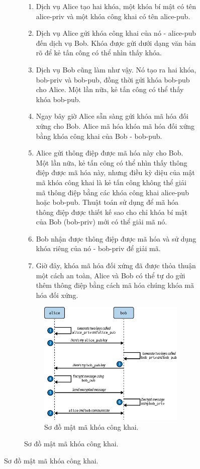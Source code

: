 \documentclass[12pt,a4paper]{report}
\begin{document}
\begin{figure}[htp]
\begin{figure}[htp]
	\hspace{0.3cm}{Hãy xem qua một ví dụ sử dụng hai dịch vụ tưởng tượng, Alice và Bob, muốn đồng ý về một khóa mã hóa đối xứng:}
	
	\begin{enumerate}
	\item Dịch vụ Alice tạo hai khóa, một khóa bí mật có tên alice-priv và một khóa công khai có tên alice-pub.
	\item Dịch vụ Alice gửi khóa công khai của nó - alice-pub đến dịch vụ Bob. Khóa được gửi dưới dạng văn bản rõ để kẻ tấn công có thể nhìn thấy khóa.
	\item Dịch vụ Bob cũng làm như vậy. Nó tạo ra hai khóa, bob-priv và bob-pub, đồng thời gửi khóa bob-pub cho Alice. Một lần nữa, kẻ tấn công có thể thấy khóa bob-pub.
	\item Ngay bây giờ Alice sẵn sàng gửi khóa mã hóa đối xứng cho Bob. Alice mã hóa khóa mã hóa đối xứng bằng khóa công khai của Bob - bob-pub.
	\item Alice gửi thông điệp được mã hóa này cho Bob. Một lần nữa, kẻ tấn công có thể nhìn thấy thông điệp được mã hóa này, nhưng điều kỳ diệu của mật mã khóa công khai là kẻ tấn công không thể giải mã thông điệp bằng các khóa công khai alice-pub hoặc bob-pub. Thuật toán sử dụng để mã hóa thông điệp được thiết kế sao cho chỉ khóa bí mật của Bob (bob-priv) mới có thể giải mã nó.
	\item Bob nhận được thông điệp được mã hóa và sử dụng khóa riêng của nó - bob-priv để giải mã.
	\item Giờ đây, khóa mã hóa đối xứng đã được thỏa thuận một cách an toàn, Alice và Bob có thể tự do gửi thêm thông điệp bằng cách mã hóa chúng khóa mã hóa đối xứng.
	\end{enumerate}

	\begin{figure}[h]
		\centering
		\includegraphics[width=0.7\linewidth]{Pics/public-key_cryptography}
		\caption{\label{fig:public-keycryptography} Sơ đồ mật mã khóa công khai.}
		\label{fig:public-keycryptography}
	\end{figure}
	

\end{figure}
\end{figure}
\end{document}
